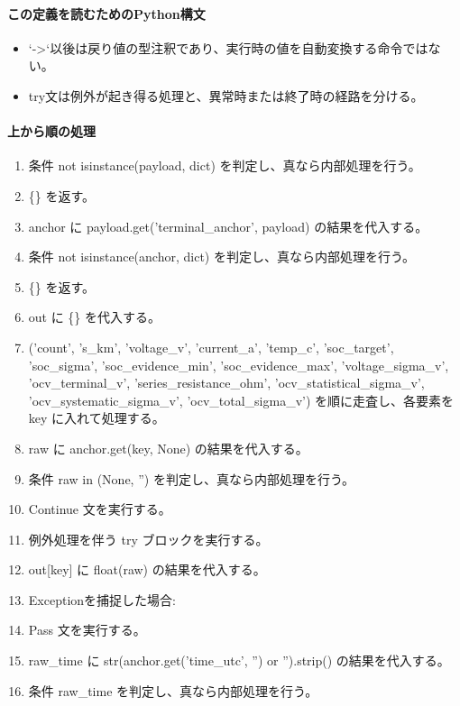 \documentclass[a4paper,11pt]{article}
\begin{document}
            \paragraph{この定義を読むためのPython構文}
            \begin{itemize}[leftmargin=1.6em]
            \item `->`以後は戻り値の型注釈であり、実行時の値を自動変換する命令ではない。
\item try文は例外が起き得る処理と、異常時または終了時の経路を分ける。
            \end{itemize}
            \paragraph{上から順の処理}
            \begin{enumerate}[leftmargin=1.8em]
            \item 条件 not isinstance(payload, dict) を判定し、真なら内部処理を行う。
\item   \{\} を返す。
\item anchor に payload.get('terminal\_anchor', payload) の結果を代入する。
\item 条件 not isinstance(anchor, dict) を判定し、真なら内部処理を行う。
\item   \{\} を返す。
\item out に \{\} を代入する。
\item ('count', 's\_km', 'voltage\_v', 'current\_a', 'temp\_c', 'soc\_target', 'soc\_sigma', 'soc\_evidence\_min', 'soc\_evidence\_max', 'voltage\_sigma\_v', 'ocv\_terminal\_v', 'series\_resistance\_ohm', 'ocv\_statistical\_sigma\_v', 'ocv\_systematic\_sigma\_v', 'ocv\_total\_sigma\_v') を順に走査し、各要素を key に入れて処理する。
\item   raw に anchor.get(key, None) の結果を代入する。
\item   条件 raw in (None, '') を判定し、真なら内部処理を行う。
\item     Continue 文を実行する。
\item   例外処理を伴う try ブロックを実行する。
\item     out[key] に float(raw) の結果を代入する。
\item     Exceptionを捕捉した場合:
\item     Pass 文を実行する。
\item raw\_time に str(anchor.get('time\_utc', '') or '').strip() の結果を代入する。
\item 条件 raw\_time を判定し、真なら内部処理を行う。

\end{enumerate}
\end{document}
